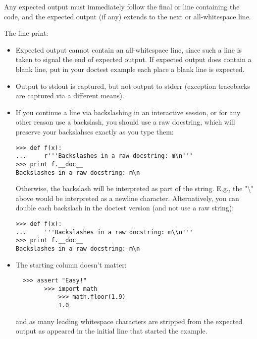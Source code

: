 Any expected output must immediately follow the final
 or  line containing the code, and
the expected output (if any) extends to the next 
or all-whitespace line.

The fine print:

\begin{itemize}

\item Expected output cannot contain an all-whitespace line, since such a
  line is taken to signal the end of expected output.  If expected
  output does contain a blank line, put  in your
  doctest example each place a blank line is expected.

\item Output to stdout is captured, but not output to stderr (exception
  tracebacks are captured via a different means).

\item If you continue a line via backslashing in an interactive session,
  or for any other reason use a backslash, you should use a raw
  docstring, which will preserve your backslahses exactly as you type
  them:

\begin{verbatim}
>>> def f(x):
...     r'''Backslashes in a raw docstring: m\n'''
>>> print f.__doc__
Backslashes in a raw docstring: m\n
\end{verbatim}

  Otherwise, the backslash will be interpreted as part of the string.
  E.g., the "{\textbackslash}" above would be interpreted as a newline
  character.  Alternatively, you can double each backslash in the
  doctest version (and not use a raw string):

\begin{verbatim}
>>> def f(x):
...     '''Backslashes in a raw docstring: m\\n'''
>>> print f.__doc__
Backslashes in a raw docstring: m\n
\end{verbatim}

\item The starting column doesn't matter:

\begin{verbatim}
  >>> assert "Easy!"
        >>> import math
            >>> math.floor(1.9)
            1.0
\end{verbatim}

and as many leading whitespace characters are stripped from the
expected output as appeared in the initial  line
that started the example.
\end{itemize}

